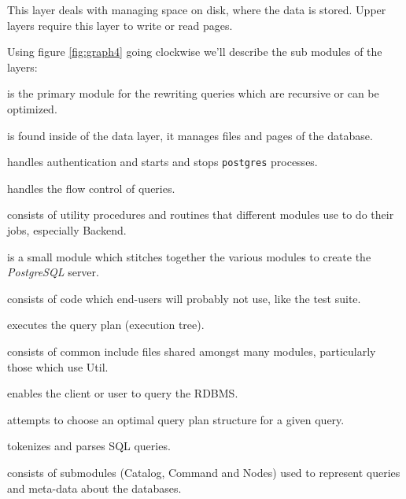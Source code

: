 \documentclass[times, 10pt,twocolumn]{article}
\newcommand{\postgresql}{\emph{PostgreSQL}\xspace}
\begin{document}
 This layer deals with managing space on
disk, where the data is stored.  Upper layers require this layer to
write or read pages.





Using figure \ref{fig:graph4} going clockwise we'll describe the sub modules of the layers:

 is the primary module for the rewriting queries which
      are recursive or can be optimized.

 is found inside of the data layer, it manages files
      and pages of the database.

 handles authentication and starts and stops
       \texttt{postgres} processes.

 handles the flow control of queries.

 consists of utility procedures and routines that different
       modules use to do their jobs, especially Backend.

 is a small module which stitches together
       the various modules to create the \postgresql server.

 consists of code which end-users will probably not use, like the test suite.

 executes the query plan (execution tree).

 consists of common include files shared amongst
many modules, particularly those which use Util.

 enables the client or user to query the RDBMS.

 attempts to choose an optimal query plan structure for a
      given query.

 tokenizes and parses SQL queries.


 consists of submodules (Catalog,
Command and Nodes) used to represent queries and meta-data about the
databases.



\end{document}
